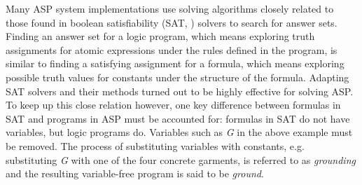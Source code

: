 \documentclass[final]{vutinfth} %
\begin{document}

Many ASP system implementations use solving algorithms closely related to those found in boolean satisfiability (SAT, \cite{sat}) solvers to search for answer sets. Finding an answer set for a logic program, which means exploring truth assignments for atomic expressions under the rules defined in the program, is similar to finding a satisfying assignment for a formula, which means exploring possible truth values for constants under the structure of the formula. Adapting SAT solvers and their methods turned out to be highly effective for solving ASP. To keep up this close relation however, one key difference between formulas in SAT and programs in ASP must be accounted for: formulas in SAT do not have variables, but logic programs do. Variables such as \emph{G} in the above example must be removed. The process of substituting variables with constants, e.g. substituting \emph{G} with one of the four concrete garments, is referred to as \emph{grounding} and the resulting variable-free program is said to be \emph{ground}.
\end{document}
